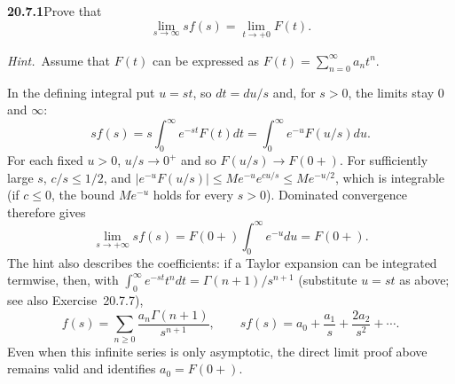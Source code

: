 \par\bigskip
\noindent\textbf{20.7.1}\quad Prove that
\[
\lim_{s\to\infty}s f(s)=\lim_{t\to+0}F(t).
\]
\par\emph{Hint.}~Assume that $F(t)$ can be expressed as
$F(t)=\displaystyle\sum_{n=0}^{\infty}a_{n}t^{n}$.
\par{}
\solution
{}
In the defining integral put $u=st$, so $dt=du/s$ and, for
$s>0$, the limits stay $0$ and $\infty$:
\[
sf(s)=s\int_0^\infty e^{-st}F(t)dt
=\int_0^\infty e^{-u}F(u/s)du.
\]
For each fixed $u>0$, $u/s\to0^+$ and so $F(u/s)\to F(0+)$.
For sufficiently large $s$, $c/s\le1/2$, and
$|e^{-u}F(u/s)|\le Me^{-u}e^{cu/s}\le M e^{-u/2}$, which is
integrable (if $c\le0$, the bound $Me^{-u}$ holds for every
$s>0$).
Dominated convergence therefore gives
\[
\lim_{s\to+\infty}sf(s)
=F(0+)\int_0^\infty e^{-u}du=\boxed{F(0+)}.
\]
The hint also describes the coefficients: if a Taylor expansion
can be integrated termwise, then, with
$\int_0^\infty e^{-st}t^ndt=\Gamma(n+1)/s^{n+1}$ (substitute
$u=st$ as above; see also Exercise~20.7.7),
\[
f(s)=\sum_{n\ge0}\frac{a_n\Gamma(n+1)}{s^{n+1}},\qquad
sf(s)=a_0+\frac{a_1}{s}+\frac{2a_2}{s^2}+\cdots.
\]
Even when this infinite series is only asymptotic, the direct
limit proof above remains valid and identifies $a_0=F(0+)$.

